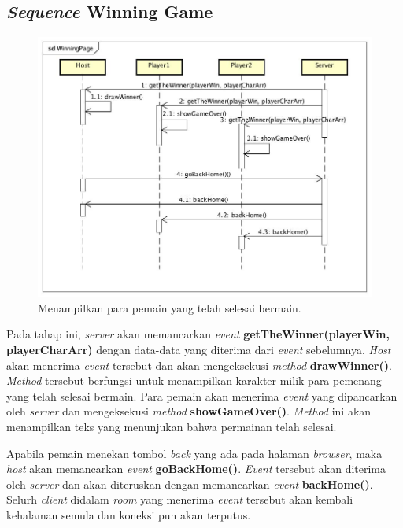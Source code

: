 \subsection{\textit{Sequence} Winning Game}
\begin{figure}[H]
	\centering
	\includegraphics[scale=0.3]{Gambar/WinningPage}
	\caption{Menampilkan para pemain yang telah selesai bermain.}
	\label{fig:4_WinningPage}
\end{figure}

Pada tahap ini, \textit{server} akan memancarkan \textit{event} \textbf{getTheWinner(playerWin, playerCharArr)} dengan data-data yang diterima dari \textit{event} sebelumnya. \textit{Host} akan menerima \textit{event} tersebut dan akan mengeksekusi \textit{method} \textbf{drawWinner()}. \textit{Method} tersebut berfungsi untuk menampilkan karakter milik para pemenang yang telah selesai bermain. Para pemain akan menerima \textit{event} yang dipancarkan oleh \textit{server} dan mengeksekusi \textit{method} \textbf{showGameOver()}. \textit{Method} ini akan menampilkan teks yang menunjukan bahwa permainan telah selesai.

Apabila pemain menekan tombol \textit{back} yang ada pada halaman \textit{browser}, maka \textit{host} akan memancarkan \textit{event} \textbf{goBackHome()}. \textit{Event} tersebut akan diterima oleh \textit{server} dan akan diteruskan dengan memancarkan \textit{event} \textbf{backHome()}. Selurh \textit{client} didalam \textit{room} yang menerima \textit{event} tersebut akan kembali kehalaman semula dan koneksi pun akan terputus.


